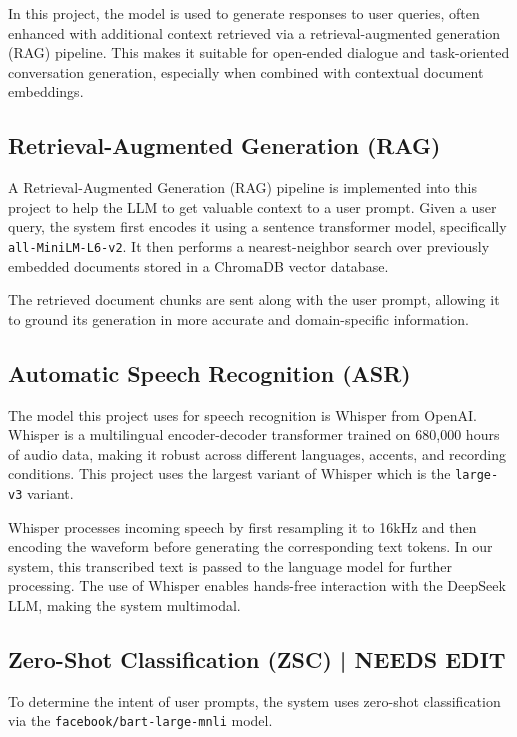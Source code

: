 \documentclass[twocolumn]{article}
\begin{document}
In this project, the model is used to generate responses to user queries, often enhanced with additional context retrieved via a retrieval-augmented generation (RAG) pipeline. This makes it suitable for open-ended dialogue and task-oriented conversation generation, especially when combined with contextual document embeddings.

\subsection{Retrieval-Augmented Generation (RAG)}
A Retrieval-Augmented Generation (RAG) pipeline is implemented into this project to help the LLM to get valuable context to a user prompt. Given a user query, the system first encodes it using a sentence transformer model, specifically \texttt{all-MiniLM-L6-v2}\cite{allminilm2021}. It then performs a nearest-neighbor search over previously embedded documents stored in a ChromaDB vector database\cite{chromadb2023}.

The retrieved document chunks are sent along with the user prompt, allowing it to ground its generation in more accurate and domain-specific information.

\subsection{Automatic Speech Recognition (ASR)}
The model this project uses for speech recognition is Whisper from OpenAI. Whisper is a multilingual encoder-decoder transformer trained on 680,000 hours of audio data, making it robust across different languages, accents, and recording conditions\cite{radford2022whisper}. This project uses the largest variant of Whisper which is the \texttt{large-v3} variant.

Whisper processes incoming speech by first resampling it to 16kHz and then encoding the waveform before generating the corresponding text tokens. In our system, this transcribed text is passed to the language model for further processing. The use of Whisper enables hands-free interaction with the DeepSeek LLM, making the system multimodal.

\subsection{Zero-Shot Classification (ZSC) | NEEDS EDIT}
To determine the intent of user prompts, the system uses zero-shot classification via the \texttt{facebook/bart-large-mnli} model\cite{facebook_bart_large_mnli}.
\end{document}
